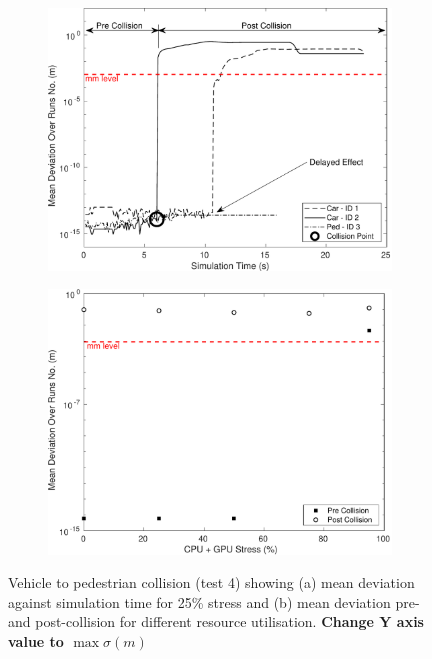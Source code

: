 \documentclass[letterpaper, 10 pt, journal, twoside]{IEEEtran}
\begin{document}
\begin{figure}[h]
    \centering
    \begin{subfigure}{.49\textwidth}
        \includegraphics[width=1\textwidth]{Other/Figures/CarsPeopleCollsionsCG25.pdf}
        \caption{}
        \label{CarsPeopleCollsionsCG25}
    \end{subfigure}
    \begin{subfigure}{.49\textwidth}
        \includegraphics[width=1\textwidth]{Other/Figures/CarsPeopleCollisionPrePost.pdf}
        \caption{}
        \label{CarsPeopleCollisionPrePost}
    \end{subfigure}
    \caption{Vehicle to pedestrian collision (test 4) showing (a) mean deviation against simulation time for 25\% stress and (b) mean deviation pre- and post-collision for different resource utilisation. \textbf{Change Y axis value to $\max\sigma (m)$}}
\end{figure}
\end{document}
